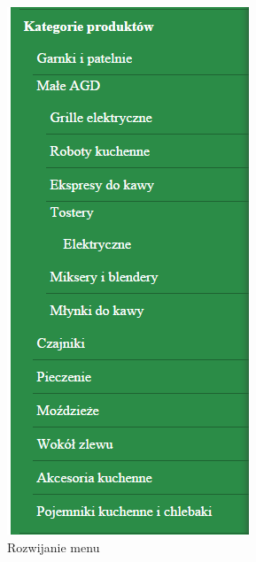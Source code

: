 \begin{figure}[H]
	\centering
	\includegraphics {fig/menu_rozwijanie}
	\caption{Rozwijanie menu}
	\label{fig:menu_rozwijalne}
\end{figure}


